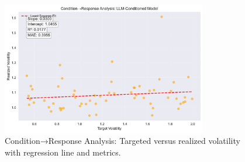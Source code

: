 \begin{figure}[htbp]
\centering
\includegraphics[width=0.8\textwidth]{figures/condition_response_analysis.pdf}
\caption{Condition→Response Analysis: Targeted versus realized volatility with regression line and metrics.}
\label{fig:condition_response}
\end{figure}